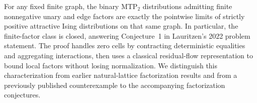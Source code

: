 
For any fixed finite graph, the binary MTP$_2$ distributions admitting finite nonnegative unary and edge factors are exactly the pointwise limits of strictly positive attractive Ising distributions on that same graph. In particular, the finite-factor class is closed, answering Conjecture~1 in Lauritzen's 2022 problem statement. The proof handles zero cells by contracting deterministic equalities and aggregating interactions, then uses a classical residual-flow representation to bound local factors without losing normalization. We distinguish this characterization from earlier natural-lattice factorization results and from a previously published counterexample to the accompanying factorization conjectures.
